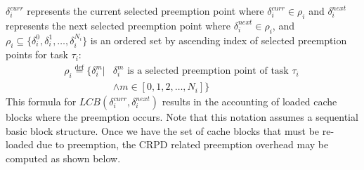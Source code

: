 \begin{math}\delta_{i}^{curr}\end{math} represents the current selected preemption point where \begin{math}\delta_{i}^{curr} \in \rho_{i}\end{math} and \begin{math}\delta_{i}^{next}\end{math} represents the next selected preemption point where \begin{math}\delta_{i}^{next} \in \rho_{i}\end{math}, and  $\rho_i \subseteq \{\delta_i^0, \delta_i^1,  \ldots, \delta_i^{N_i}\}$ is an ordered set by ascending index of selected preemption points for task \begin{math}\tau_{i}\end{math}:
\begin{equation*}\label{eqn:pp-set_b}
\begin{split}
   \rho_{i} \stackrel{\text{def}}{=} \{\delta_{i}^{m}|&\delta_{i}^{m} \text{ is a selected preemption point of task } \tau_{i}\ \\ &\wedge m \in [0, 1, 2, \ldots, N_{i}]\}
\end{split}
\end{equation*}
\noindent
This formula for \begin{math}\textit{LCB}(\delta_{i}^{curr},\delta_{i}^{next})\end{math} results in the accounting of loaded cache blocks where the preemption occurs.  Note that this notation assumes a sequential basic block structure. Once we have the set of cache blocks that must be re-loaded due to preemption, the CRPD related preemption overhead may be computed as shown below.
